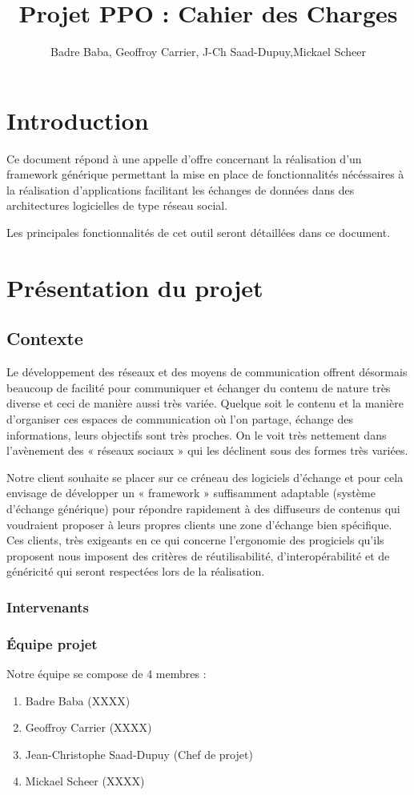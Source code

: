 \documentclass[10pt,a4paper]{article}
\title{Projet PPO : Cahier des Charges}
\author{
	Badre Baba, Geoffroy Carrier, J-Ch Saad-Dupuy,Mickael Scheer
}
\begin{document}
\maketitle

\section{Introduction}

Ce document répond à une appelle d'offre concernant la réalisation d'un framework
générique permettant la mise en place de fonctionnalités nécéssaires à la
réalisation d'applications facilitant les échanges de données dans des architectures
logicielles de type réseau social.

Les principales fonctionnalités de cet outil seront détaillées dans ce
document.

\section{Présentation du projet}
 \subsection{Contexte}
Le développement des réseaux et des moyens de communication offrent désormais beaucoup
de facilité pour communiquer et échanger du contenu de nature très diverse et ceci de manière aussi très variée. Quelque soit le contenu et la manière d’organiser ces espaces de communication où l’on partage, échange des informations, leurs objectifs sont très proches.
On le voit très nettement dans l’avènement des « réseaux sociaux » qui les déclinent sous des formes très variées.

Notre client souhaite se placer sur ce créneau des logiciels d’échange et pour cela
envisage de développer un « framework » suffisamment adaptable (système d’échange
générique) pour répondre rapidement à des diffuseurs de contenus qui voudraient proposer à leurs propres clients une zone d’échange bien spécifique. Ces clients, très exigeants en ce qui concerne l’ergonomie des progiciels qu’ils proposent nous imposent des critères de réutilisabilité, d'interopérabilité et de généricité qui seront respectées lors de la réalisation.

  \subsubsection{Intervenants}
  \subsubsection{Équipe projet}
Notre équipe se compose de 4 membres :
\begin{enumerate}
 \item Badre Baba (XXXX)
 \item Geoffroy Carrier (XXXX)
 \item Jean-Christophe Saad-Dupuy (Chef de projet)
 \item Mickael Scheer (XXXX)
\end{enumerate}
\end{document}
